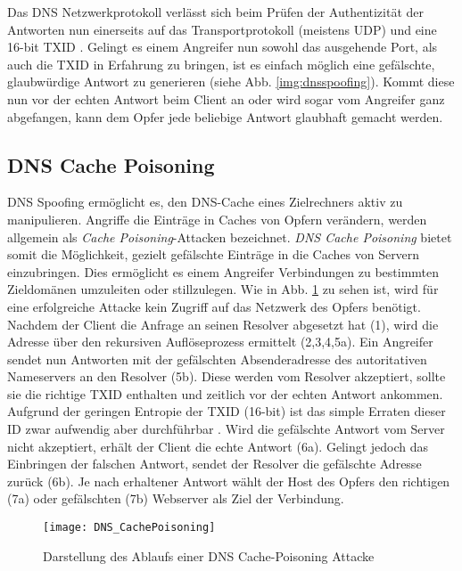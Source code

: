 Das DNS Netzwerkprotokoll verlässt sich beim Prüfen der Authentizität der Antworten nun einerseits auf das Transportprotokoll (meistens UDP) und eine 16-bit \ac{TXID} \cite{rfc1035}. Gelingt es einem Angreifer nun sowohl das ausgehende Port, als auch die \ac{TXID} in Erfahrung zu bringen, ist es einfach möglich eine gefälschte, glaubwürdige Antwort zu generieren (siehe Abb. \ref{img:dnsspoofing}). Kommt diese nun vor der echten Antwort beim Client an oder wird sogar vom Angreifer ganz abgefangen, kann dem Opfer jede beliebige Antwort glaubhaft gemacht werden.

\subsection{DNS Cache Poisoning}
DNS Spoofing ermöglicht es, den DNS-Cache eines Zielrechners aktiv zu manipulieren. Angriffe die Einträge in Caches von Opfern verändern, werden allgemein als \textit{Cache Poisoning}-Attacken bezeichnet\cite{CAPEC141}. \textit{DNS Cache Poisoning} bietet somit die Möglichkeit, gezielt gefälschte Einträge in die Caches von Servern einzubringen\cite{CAPEC142}. Dies ermöglicht es einem Angreifer Verbindungen zu bestimmten Zieldomänen umzuleiten oder stillzulegen. Wie in Abb. \ref{img:dnscachepoisoning} zu sehen ist, wird für eine erfolgreiche Attacke kein Zugriff auf das Netzwerk des Opfers benötigt. Nachdem der Client die Anfrage an seinen Resolver abgesetzt hat (1), wird die Adresse über den rekursiven Auflöseprozess ermittelt (2,3,4,5a). Ein Angreifer sendet nun Antworten mit der gefälschten Absenderadresse des autoritativen Nameservers an den Resolver (5b). Diese werden vom Resolver akzeptiert, sollte sie die richtige \ac{TXID} enthalten und zeitlich vor der echten Antwort ankommen. Aufgrund der geringen Entropie der \ac{TXID} (16-bit) ist das simple Erraten dieser ID zwar aufwendig aber durchführbar \cite{Son2010}. Wird die gefälschte Antwort vom Server nicht akzeptiert, erhält der Client die echte Antwort (6a). Gelingt jedoch das Einbringen der falschen Antwort, sendet der Resolver die gefälschte Adresse zurück (6b). Je nach erhaltener Antwort wählt der Host des Opfers den richtigen (7a) oder gefälschten (7b) Webserver als Ziel der Verbindung.    

\begin{figure}[htbp]
    \centering
    \texttt{[image: DNS\_CachePoisoning]}
    \caption{Darstellung des Ablaufs einer DNS Cache-Poisoning Attacke}
    \label{img:dnscachepoisoning}
\end{figure}

